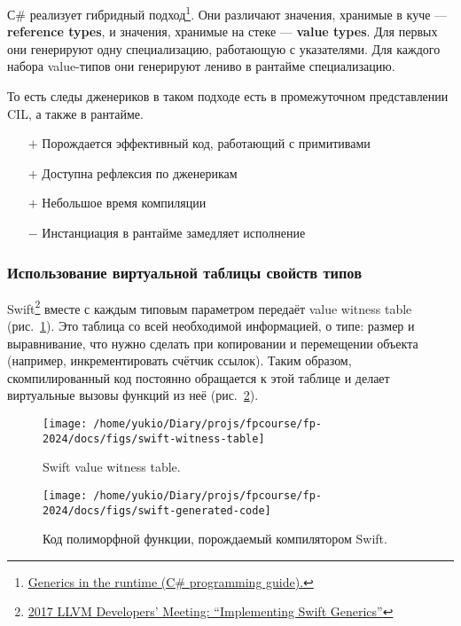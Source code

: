 \documentclass[12pt]{article}
\newcommand{\vocab}[1]{\textbf{#1}} %
\newcommand{\positive}{$+$} %
\newcommand{\negative}{{\color{red} $-$}} %
\begin{document}
    С\# реализует гибридный подход\footnote{\href{https://learn.microsoft.com/en-us/dotnet/csharp/programming-guide/generics/generics-in-the-run-time}{Generics in the runtime (C\# programming guide).}}.
    Они различают значения, хранимые в куче --- \vocab{reference types}, и значения, хранимые на стеке --- \vocab{value types}.
    Для первых они генерируют одну специализацию, работающую с указателями.
    Для каждого набора value-типов они генерируют лениво в рантайме специализацию.

    То есть следы дженериков в таком подходе есть в промежуточном представлении CIL, а также в рантайме.

    \begin{itemize}
        \item[\positive] Порождается эффективный код, работающий с примитивами
        \item[\positive] Доступна рефлексия по дженерикам
        \item[\positive] Небольшое время компиляции
        \item[\negative] Инстанциация в рантайме замедляет исполнение
    \end{itemize}

    \subsubsection{Использование виртуальной таблицы свойств типов}

    Swift\footnote{\href{https://youtu.be/ctS8FzqcRug?si=y_ZYnuUOulA33d_X}{2017 LLVM Developers’ Meeting: ``Implementing Swift Generics''}} вместе с каждым типовым параметром передаёт value witness table (рис.~\ref{fig:swift-witness-table}).
    Это таблица со всей необходимой информацией, о типе: размер и выравнивание, что нужно сделать при копировании и перемещении объекта (например, инкрементировать счётчик ссылок).
    Таким образом, скомпилированный код постоянно обращается к этой таблице и делает виртуальные вызовы функций из неё (рис.~\ref{fig:swift-generated-code}).
    \begin{figure}
        \centering
        \texttt{[image: /home/yukio/Diary/projs/fpcourse/fp-2024/docs/figs/swift-witness-table]}
        \caption{Swift value witness table.}
        \label{fig:swift-witness-table}
    \end{figure}
    \begin{figure}
        \centering
        \texttt{[image: /home/yukio/Diary/projs/fpcourse/fp-2024/docs/figs/swift-generated-code]}
        \caption{Код полиморфной функции, порождаемый компилятором Swift.}
        \label{fig:swift-generated-code}
    \end{figure}
\end{document}
